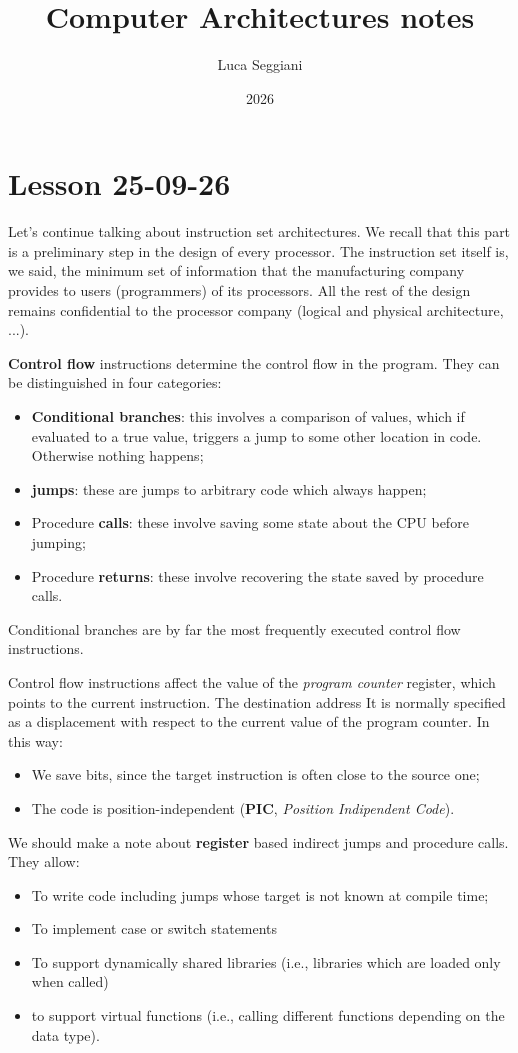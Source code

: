 \documentclass[a4paper,11pt]{article}
\title{Computer Architectures notes}
\author{Luca Seggiani}
\date{2026}
\begin{document}
\section{Lesson 25-09-26}

\thispagestyle{empty}
\pagestyle{fancy}

Let's continue talking about instruction set architectures.
We recall that this part is a preliminary step in the design of every processor.
The instruction set itself is, we said, the minimum set of information that the manufacturing company provides to users (programmers) of its processors.
All the rest of the design remains confidential to the processor company (logical and physical architecture, ...).

\par\smallskip

\textbf{\textsf{Control flow}} instructions determine the control flow in the program.
They can be distinguished in four categories:
\begin{itemize}
	\item \textbf{Conditional branches}: this involves a comparison of values, which if evaluated to a true value, triggers a jump to some other location in code. Otherwise nothing happens;
	\item \textbf{jumps}: these are jumps to arbitrary code which always happen;
	\item Procedure \textbf{calls}: these involve saving some state about the CPU before jumping;
	\item Procedure \textbf{returns}: these involve recovering the state saved by procedure calls.
\end{itemize}
Conditional branches are by far the most frequently executed control flow instructions.

Control flow instructions affect the value of the \textit{program counter} register, which points to the current instruction.
The destination address It is normally specified as a displacement with respect to the current value of the program counter.
In this way:
\begin{itemize}
	\item We save bits, since the target instruction is often close to the source one;
	\item The code is position-independent (\textbf{PIC}, \textit{Position Indipendent Code}).
\end{itemize}

We should make a note about \textbf{register} based indirect jumps and procedure calls.
They allow:
\begin{itemize}
	\item To write code including jumps whose target is not known at compile time;
	\item To implement case or switch statements
	\item To support dynamically shared libraries (i.e., libraries which are loaded only when called)
	\item to support virtual functions (i.e., calling different functions depending on the data type).
\end{itemize}
\end{document}
